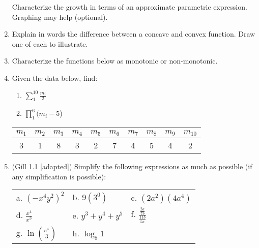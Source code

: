 \documentclass[11pt]{article}
\begin{document}
\begin{enumerate}
Characterize the growth in terms of an approximate parametric expression.  Graphing may help (optional).


\item Explain in words the difference between a concave and convex function.  Draw one of each to illustrate. 


\item Characterize the functions below as monotonic or non-monotonic.

\begin{center}
\end{center}


\item Given the data below, find:
\begin{enumerate}
\item $\displaystyle\sum_1^{10} \frac{m_i}{2}$ %
\item $\displaystyle\prod_1^{6} (m_i - 5$) %
\end{enumerate}
\begin{center}
\begin{tabular}{c|c|c|c|c|c|c|c|c|c}
$m_1$  & $m_2$ & $m_3$ & $m_4$ & $m_5$ & $m_6$ & $m_7$ & $m_8$ & $m_9$ & $m_{10}$   \\ \hline
3      & 1     & 8     & 3     & 2     & 7     & 4     & 5     & 4     & 2       \end{tabular}
\end{center}



\item (Gill 1.1 [adapted]) Simplify the following expressions as much as possible (if any simplification is possible):
\begin{center}
\begin{tabular}{p{3cm}p{3cm}p{3cm}}
a. $(-x^4y^2)^2$       &  b. $9(3^0)$                                 & c. $(2a^2)(4a^4)$                     \rule{0cm}{1cm}\\
d. $\displaystyle\frac{x^4}{x^3}$   &  e. $y^3 + y^4 + y^5$                        & f. $\displaystyle\frac{\frac{2a}{7b}}{\frac{11b}{5a}}$ \rule{0cm}{1cm}\\
g. $\ln (\frac{e^4}{3})$& h. $\displaystyle\log_8 1$
\rule{0cm}{1cm}\\
\end{tabular}
\end{center}



\end{enumerate}
\end{document}
